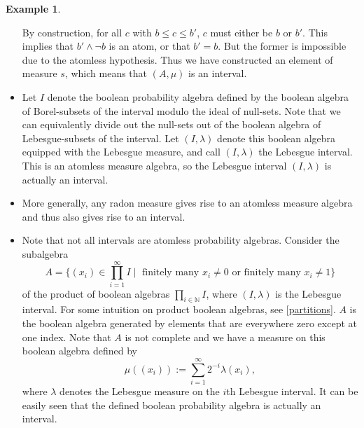 \documentclass[a4paper]{amsproc}
\theoremstyle{plain}
\theoremstyle{definition}
\newtheorem{example}[theorem]{Example}
\theoremstyle{remark}
\numberwithin{equation}{section}
\begin{document}
\begin{example}
\begin{itemize}
By construction, for all $c$ with $b \leq c \leq b'$, $c$ must either be $b$ or $b'$. This implies that $b' \wedge \neg b$ is an atom, or that $b' = b$. But the former is impossible due to the atomless hypothesis. Thus we have constructed an element of measure $s$, which means that $(A,\mu)$ is an interval.
\item Let $I$ denote the boolean probability algebra defined by the boolean algebra of Borel-subsets of the interval modulo the ideal of null-sets. Note that we can equivalently divide out the null-sets out of the boolean algebra of Lebesgue-subsets of the interval. Let $(I, \lambda)$ denote this boolean algebra equipped with the Lebesgue measure, and call $(I, \lambda)$ the Lebesgue interval. This is an atomless measure algebra, so the Lebesgue interval $(I, \lambda)$ is actually an interval.
\item More generally, any radon measure gives rise to an atomless measure algebra and thus also gives rise to an interval.
\item Note that not all intervals are atomless probability algebras. Consider the subalgebra
\[
A = \{(x_i) \in \prod_{i=1}^{\infty} I \mid \text{ finitely many } x_i \neq 0 \text{ or finitely many } x_i \neq 1 \}
\]
of the product of boolean algebras $\prod_{i \in \mathbb{N}} I$, where $(I, \lambda)$ is the Lebesgue interval. For some intuition on product boolean algebras, see \ref{partitions}. $A$ is the boolean algebra generated by elements that are everywhere zero except at one index. Note that $A$ is not complete and we have a measure on this boolean algebra defined by
\[
\mu((x_i)) := \sum_{i=1}^{\infty} 2^{-i} \lambda(x_i) ,
\]
where $\lambda$ denotes the Lebesgue measure on the $i$th Lebesgue interval. It can be easily seen that the defined boolean probability algebra is actually an interval.
\end{itemize}
\end{example}
\end{document}
